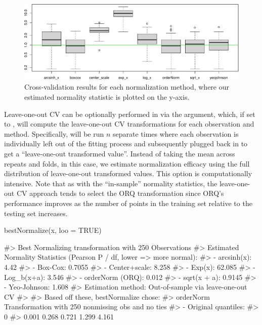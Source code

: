 \begin{Schunk}
\begin{figure}

{\centering \includegraphics[width=1\linewidth]{figs/boxplot-1} 

}

\caption[Cross-validation results for each normalization method, where our estimated normality statistic is plotted on the y-axis]{Cross-validation results for each normalization method, where our estimated normality statistic is plotted on the y-axis.}\label{fig:boxplot}
\end{figure}
\end{Schunk}

Leave-one-out CV can be optionally performed in  via
the  argument, which, if set to , will compute the
leave-one-out CV transformations for each observation and method.
Specifically,  will be run \(n\) separate times
where each observation is individually left out of the fitting process
and subsequently plugged back in to get a ``leave-one-out transformed
value''. Instead of taking the mean across repeats and folds, in this
case, we estimate normalization efficacy using the full distribution of
leave-one-out transformed values. This option is computationally
intensive. Note that as with the ``in-sample'' normality statistics, the
leave-one-out CV approach tends to select the ORQ transformation since
ORQ's performance improves as the number of points in the training set
relative to the testing set increases.

\begin{Schunk}
\begin{Sinput}
bestNormalize(x, loo = TRUE)
\end{Sinput}
\begin{Soutput}
#> Best Normalizing transformation with 250 Observations
#>  Estimated Normality Statistics (Pearson P / df, lower => more normal):
#>  - arcsinh(x): 4.42
#>  - Box-Cox: 0.7055
#>  - Center+scale: 8.258
#>  - Exp(x): 62.085
#>  - Log_b(x+a): 3.546
#>  - orderNorm (ORQ): 0.012
#>  - sqrt(x + a): 0.9145
#>  - Yeo-Johnson: 1.608
#> Estimation method: Out-of-sample via leave-one-out CV
#>  
#> Based off these, bestNormalize chose:
#> orderNorm Transformation with 250 nonmissing obs and no ties 
#>  - Original quantiles:
#>    0%
#> 0.001 0.268 0.721 1.299 4.161
\end{Soutput}
\end{Schunk}

